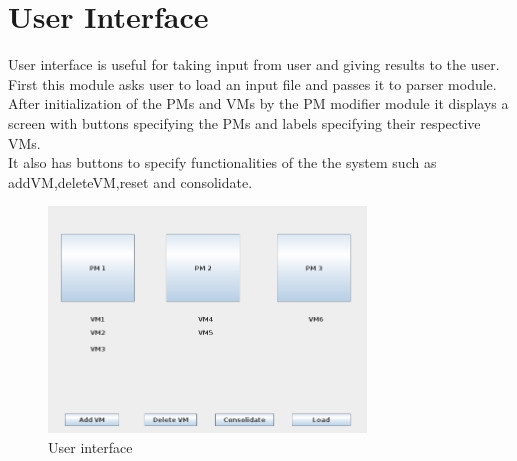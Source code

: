 \documentclass{article}
\begin{document}
\section{User Interface}
User interface is useful for taking input from  user and giving results to the user. First this module asks user to load an 
input file and passes it to parser module. After initialization of the PMs and VMs by the PM modifier module it displays a 
screen with buttons specifying the PMs and labels specifying their respective VMs.\\
It also has buttons to specify functionalities of the the system such as addVM,deleteVM,reset and consolidate. 
\begin{figure}[h]
\centering
\includegraphics[height=6cm]{3.png}
\caption{User interface}
\end{figure}
\end{document}
